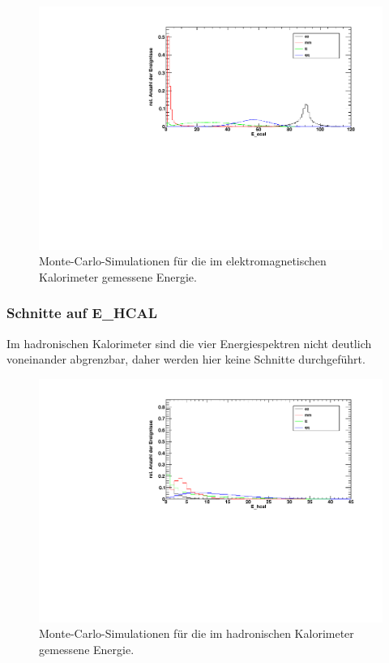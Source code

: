 \begin{figure}[H]
\begin{center}
  \includegraphics[width=\textwidth]{../img/dist_E_ecal.pdf}
 \caption{Monte-Carlo-Simulationen für die im elektromagnetischen Kalorimeter
 gemessene Energie.}
  \label{img:dist_E_ecal}
\end{center}
\end{figure} 

\subsubsection*{Schnitte auf E\_HCAL}
Im hadronischen Kalorimeter sind die vier Energiespektren nicht deutlich voneinander abgrenzbar,
daher werden hier keine Schnitte durchgeführt.

\begin{figure}[H]
\begin{center}
  \includegraphics[width=\textwidth]{../img/dist_E_hcal.pdf}
 \caption{Monte-Carlo-Simulationen für die im hadronischen Kalorimeter
 gemessene Energie.}
  \label{img:dist_E_hcal}
\end{center}
\end{figure} 


